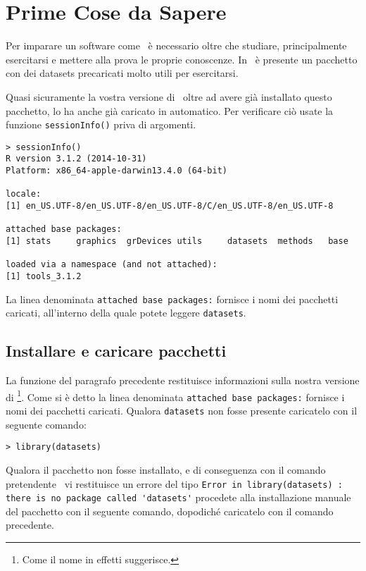 \section{Prime Cose da Sapere}
Per imparare un software come \erre\ è necessario oltre che studiare, principalmente esercitarsi e mettere alla prova le proprie conoscenze. In \erre\ è presente un pacchetto con dei datasets precaricati molto utili per esercitarsi.

Quasi sicuramente la vostra versione di \erre\ oltre ad avere già installato questo pacchetto, lo ha anche già caricato in automatico. Per verificare ciò usate la funzione \lstinline!sessionInfo()! priva di argomenti.

\begin{lstlisting}
> sessionInfo()
R version 3.1.2 (2014-10-31)
Platform: x86_64-apple-darwin13.4.0 (64-bit)

locale:
[1] en_US.UTF-8/en_US.UTF-8/en_US.UTF-8/C/en_US.UTF-8/en_US.UTF-8

attached base packages:
[1] stats     graphics  grDevices utils     datasets  methods   base     

loaded via a namespace (and not attached):
[1] tools_3.1.2
\end{lstlisting}

La linea denominata \lstinline!attached base packages:! fornisce i nomi dei pacchetti caricati, all'interno della quale potete leggere \lstinline!datasets!.

\subsection{Installare e caricare pacchetti}
La funzione del paragrafo precedente restituisce informazioni sulla nostra versione di \erre\footnote{Come il nome in effetti suggerisce.}. Come si è detto la linea denominata \lstinline!attached base packages:! fornisce i nomi dei pacchetti caricati. Qualora \lstinline!datasets! non fosse presente caricatelo con il seguente comando:

\begin{lstlisting}
> library(datasets)
\end{lstlisting}

Qualora il pacchetto non fosse installato, e di conseguenza con il comando pretendente \erre\ vi restituisce un errore del tipo \lstinline!Error in library(datasets) : there is no package called 'datasets'!  procedete alla installazione manuale del pacchetto con il seguente comando, dopodiché caricatelo con il comando precedente.

